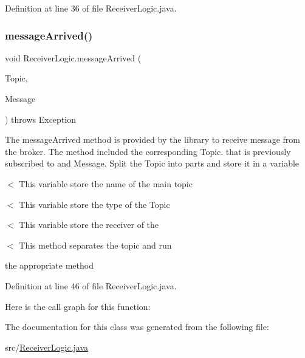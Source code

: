 Definition at line 36 of file Receiver\+Logic.\+java.

\mbox{\label{class_receiver_logic_a2cfef54ab9bdcc6ddde72db5c7bdba97}} 
\subsubsection{\texorpdfstring{message\+Arrived()}{messageArrived()}}
{\footnotesize\ttfamily void Receiver\+Logic.\+message\+Arrived (\begin{DoxyParamCaption}\item[{String}]{Topic,  }\item[{Mqtt\+Message}]{Message }\end{DoxyParamCaption}) throws Exception}

The message\+Arrived method is provided by the library to receive message from the broker. The method included the corresponding Topic. that is previously subscribed to and Message. Split the Topic into parts and store it in a variable

$<$ This variable store the name of the main topic

$<$ This variable store the type of the Topic

$<$ This variable store the receiver of the

$<$ This method separates the topic and run

the appropriate method 

Definition at line 46 of file Receiver\+Logic.\+java.

Here is the call graph for this function\+:


The documentation for this class was generated from the following file\+:\begin{DoxyCompactItemize}
\item 
src/\hyperlink{_receiver_logic_8java}{Receiver\+Logic.\+java}\end{DoxyCompactItemize}
